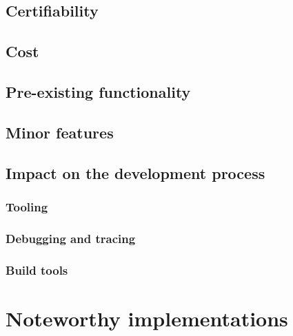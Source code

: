 \subsection{Certifiability}
\subsection{Cost}
\subsection{Pre-existing functionality}
\subsection{Minor features}
\subsection{Impact on the development process}
\subsubsection{Tooling}
\subsubsection{Debugging and tracing}
\subsubsection{Build tools}


\section{Noteworthy implementations}